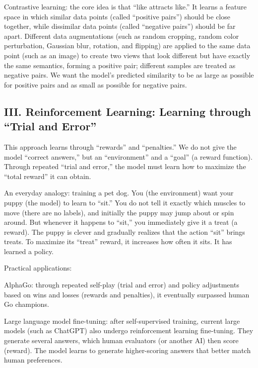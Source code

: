 Contrastive learning: the core idea is that ``like attracts like.'' It learns a feature space in which similar data points (called ``positive pairs'') should be close together, while dissimilar data points (called ``negative pairs'') should be far apart. Different data augmentations (such as random cropping, random color perturbation, Gaussian blur, rotation, and flipping) are applied to the same data point (such as an image) to create two views that look different but have exactly the same semantics, forming a positive pair; different samples are treated as negative pairs. We want the model's predicted similarity to be as large as possible for positive pairs and as small as possible for negative pairs.

\hypertarget{iii.-reinforcement-learning-learning-through-trial-and-error}{%
\subsection{III. Reinforcement Learning: Learning through ``Trial and Error''}\label{iii.-reinforcement-learning-learning-through-trial-and-error}}

This approach learns through ``rewards'' and ``penalties.'' We do not give the model ``correct answers,'' but an ``environment'' and a ``goal'' (a reward function). Through repeated ``trial and error,'' the model must learn how to maximize the ``total reward'' it can obtain.

An everyday analogy: training a pet dog. You (the environment) want your puppy (the model) to learn to ``sit.'' You do not tell it exactly which muscles to move (there are no labels), and initially the puppy may jump about or spin around. But whenever it happens to ``sit,'' you immediately give it a treat (a reward). The puppy is clever and gradually realizes that the action ``sit'' brings treats. To maximize its ``treat'' reward, it increases how often it sits. It has learned a policy.

Practical applications:

AlphaGo: through repeated self-play (trial and error) and policy adjustments based on wins and losses (rewards and penalties), it eventually surpassed human Go champions.

Large language model fine-tuning: after self-supervised training, current large models (such as ChatGPT) also undergo reinforcement learning fine-tuning. They generate several answers, which human evaluators (or another AI) then score (reward). The model learns to generate higher-scoring answers that better match human preferences.


